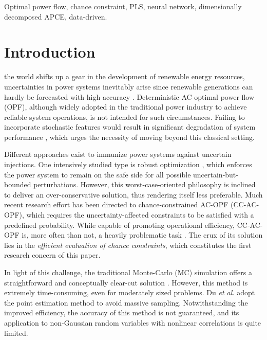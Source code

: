 \documentclass[journal]{IEEEtran}
\theoremstyle{definition}
\theoremstyle{remark}
\begin{document}
\begin{IEEEkeywords}
Optimal power flow, chance constraint, PLS, neural network, dimensionally decomposed APCE, data-driven.
\end{IEEEkeywords}

\IEEEpeerreviewmaketitle



\section{Introduction}\label{introduction}
 the world shifts up a gear in the development of renewable energy resources, uncertainties in power systems inevitably arise since renewable generations can hardly be forecasted with high accuracy \cite{wang2023two}.
Deterministic AC optimal power flow (OPF), although widely adopted in the traditional power industry to achieve reliable system operations, is not intended for such circumstances. Failing to incorporate stochastic features would result in significant degradation of system performance \cite{yang2023tracking}, which urges the necessity of moving beyond this classical setting.  

Different approaches exist to immunize power systems against uncertain injections. One intensively studied type is robust optimization \cite{qiu2020historical}, which enforces the power system to remain on the safe side for all possible uncertain-but-bounded perturbations. However, this worst-case-oriented philosophy is inclined to deliver an over-conservative solution, thus rendering itself less preferable. Much recent research effort has been directed to chance-constrained AC-OPF (CC-AC-OPF), which requires the uncertainty-affected constraints to be satisfied with a predefined probability. While capable of promoting operational efficiency, CC-AC-OPF is, more often than not, a heavily problematic task \cite{pena2020solving}. The crux of its solution lies in the \textit{ efficient evaluation of chance constraints}, which constitutes the first research concern of this paper. 

In light of this challenge, the traditional Monte-Carlo (MC) simulation offers a straightforward and conceptually clear-cut solution \cite{zhang2010probabilistic}. However, this method is extremely time-consuming, even for moderately sized problems. Du \textit{et al.} \cite{du2021chance} adopt the point estimation method to avoid massive sampling. Notwithstanding the improved efficiency, the accuracy of this method is not guaranteed, and its application to non-Gaussian random variables with nonlinear correlations is quite limited. 
\end{document}
